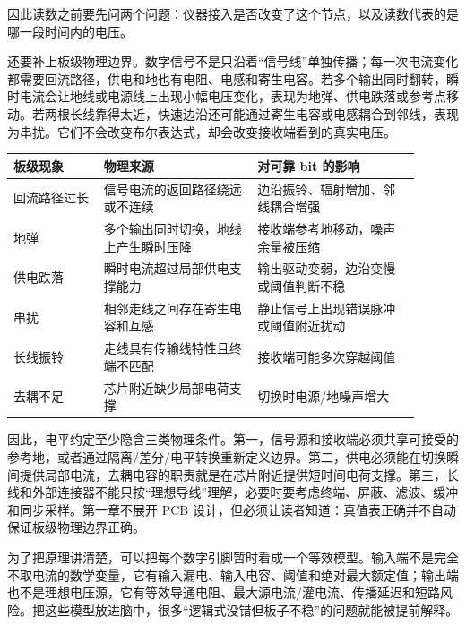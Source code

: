 因此读数之前要先问两个问题：仪器接入是否改变了这个节点，以及读数代表的是哪一段时间内的电压。

还要补上板级物理边界。数字信号不是只沿着“信号线”单独传播；每一次电流变化都需要回流路径，供电和地也有电阻、电感和寄生电容。若多个输出同时翻转，瞬时电流会让地线或电源线上出现小幅电压变化，表现为地弹、供电跌落或参考点移动。若两根长线靠得太近，快速边沿还可能通过寄生电容或电感耦合到邻线，表现为串扰。它们不会改变布尔表达式，却会改变接收端看到的真实电压。

\begin{longtable}{L{0.2\linewidth}L{0.34\linewidth}L{0.36\linewidth}}
\toprule
板级现象 & 物理来源 & 对可靠 bit 的影响 \\
\midrule
回流路径过长 & 信号电流的返回路径绕远或不连续 & 边沿振铃、辐射增加、邻线耦合增强 \\
地弹 & 多个输出同时切换，地线上产生瞬时压降 & 接收端参考地移动，噪声余量被压缩 \\
供电跌落 & 瞬时电流超过局部供电支撑能力 & 输出驱动变弱，边沿变慢或阈值判断不稳 \\
串扰 & 相邻走线之间存在寄生电容和互感 & 静止信号上出现错误脉冲或阈值附近扰动 \\
长线振铃 & 走线具有传输线特性且终端不匹配 & 接收端可能多次穿越阈值 \\
去耦不足 & 芯片附近缺少局部电荷支撑 & 切换时电源/地噪声增大 \\
\bottomrule
\end{longtable}

因此，电平约定至少隐含三类物理条件。第一，信号源和接收端必须共享可接受的参考地，或者通过隔离/差分/电平转换重新定义边界。第二，供电必须能在切换瞬间提供局部电流，去耦电容的职责就是在芯片附近提供短时间电荷支撑。第三，长线和外部连接器不能只按“理想导线”理解，必要时要考虑终端、屏蔽、滤波、缓冲和同步采样。第一章不展开 PCB 设计，但必须让读者知道：真值表正确并不自动保证板级物理边界正确。

为了把原理讲清楚，可以把每个数字引脚暂时看成一个等效模型。输入端不是完全不取电流的数学变量，它有输入漏电、输入电容、阈值和绝对最大额定值；输出端也不是理想电压源，它有等效导通电阻、最大源电流/灌电流、传播延迟和短路风险。把这些模型放进脑中，很多“逻辑式没错但板子不稳”的问题就能被提前解释。

